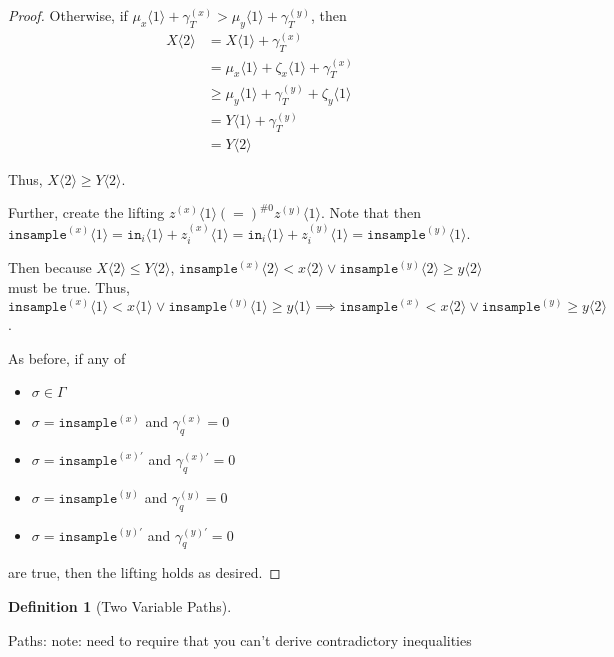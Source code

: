 \documentclass[12pt]{article}
\newcommand{\brangle}[1]{\langle #1 \rangle}
\theoremstyle{definition}
\newtheorem{defn}[thm]{Definition}
\begin{document}
\begin{proof}
    Otherwise, if $\mu_x\brangle{1}+\gamma_T^{(x)}> \mu_y\brangle{1}+\gamma_T^{(y)}$, then \begin{align*}
        X\brangle{2} &= X\brangle{1} + \gamma_T^{(x)}\\
        &=\mu_x\brangle{1} + \zeta_x\brangle{1} + \gamma_T^{(x)}\\
        &\geq \mu_y\brangle{1} +\gamma_T^{(y)}+\zeta_y\brangle{1}\\
        &=Y\brangle{1} + \gamma_T^{(y)}\\
        &= Y\brangle{2}
    \end{align*}

    Thus, $X\brangle{2}\geq Y\brangle{2}$.

    Further, create the lifting $z^{(x)}\brangle{1}(=)^{\#0}z^{(y)}\brangle{1}$. Note that then $\texttt{insample}^{(x)}\brangle{1}=\texttt{in}_i\brangle{1} + z_i^{(x)}\brangle{1} =\texttt{in}_i\brangle{1} + z_i^{(y)}\brangle{1}=\texttt{insample}^{(y)}\brangle{1}$.

    Then because $X\brangle{2} \leq Y\brangle{2}$, $\texttt{insample}^{(x)}\brangle{2}<x\brangle{2}\lor \texttt{insample}^{(y)}\brangle{2}\geq y\brangle{2}$ must be true. Thus, $\texttt{insample}^{(x)}\brangle{1}<x\brangle{1}\lor\texttt{insample}^{(y)}\brangle{1}\geq y\brangle{1}\implies \texttt{insample}^{(x)}<x\brangle{2}\lor\texttt{insample}^{(y)}\geq y\brangle{2}$.

    As before, if any of \begin{itemize}
        \item $\sigma \in \Gamma$
        \item $\sigma = \texttt{insample}^{(x)}$ and $\gamma_q^{(x)}=0$ 
        \item $\sigma = \texttt{insample}^{(x)\prime}$ and $\gamma_q^{(x)\prime}=0$ 
        \item $\sigma = \texttt{insample}^{(y)}$ and $\gamma_q^{(y)}=0$
        \item $\sigma = \texttt{insample}^{(y)\prime}$ and $\gamma_q^{(y)\prime}=0$
    \end{itemize}
    are true, then the lifting holds as desired. 

\end{proof}

\begin{defn}[Two Variable Paths]
    
\end{defn}


Paths:
{\color{red} note: need to require that you can't derive contradictory inequalities}
\end{document}
